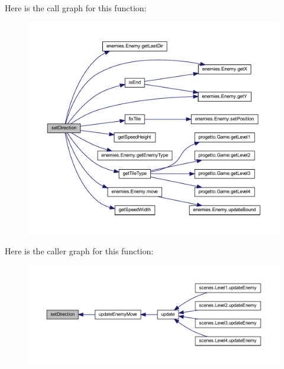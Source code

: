 Here is the call graph for this function\+:
\nopagebreak
\begin{figure}[H]
\begin{center}
\leavevmode
\includegraphics[width=350pt]{classmanagers_1_1_enemy_manager_a839e4729819875981f138997b2d3f438_cgraph}
\end{center}
\end{figure}
Here is the caller graph for this function\+:
\nopagebreak
\begin{figure}[H]
\begin{center}
\leavevmode
\includegraphics[width=350pt]{classmanagers_1_1_enemy_manager_a839e4729819875981f138997b2d3f438_icgraph}
\end{center}
\end{figure}
\mbox{\label{classmanagers_1_1_enemy_manager_aa38fcad82cf2cd5ac5531d8c2004fdda}} 
